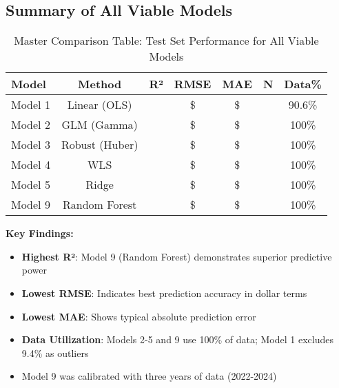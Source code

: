 \subsection{Summary of All Viable Models}

\begin{table}[h!]
\centering
\caption{Master Comparison Table: Test Set Performance for All Viable Models}
\label{tab:master_comparison}
\begin{tabular}{lcccccc}
\toprule
\textbf{Model} & \textbf{Method} & \textbf{R²} & \textbf{RMSE} & \textbf{MAE} & \textbf{N} & \textbf{Data\%} \\
\midrule
Model 1 & Linear (OLS) & \ModelOneRSquaredTest{} & \$\ModelOneRMSETest{} & \$\ModelOneMAETest{} & \ModelOneTestSamples{} & 90.6\% \\
Model 2 & GLM (Gamma) & \ModelTwoRSquaredTest{} & \$\ModelTwoRMSETest{} & \$\ModelTwoMAETest{} & \ModelTwoTestSamples{} & 100\% \\
Model 3 & Robust (Huber) & \ModelThreeRSquaredTest{} & \$\ModelThreeRMSETest{} & \$\ModelThreeMAETest{} & \ModelThreeTestSamples{} & 100\% \\
Model 4 & WLS & \ModelFourRSquaredTest{} & \$\ModelFourRMSETest{} & \$\ModelFourMAETest{} & \ModelFourTestSamples{} & 100\% \\
Model 5 & Ridge & \ModelFiveRSquaredTest{} & \$\ModelFiveRMSETest{} & \$\ModelFiveMAETest{} & \ModelFiveTestSamples{} & 100\% \\
Model 9 & Random Forest & \ModelNineRSquaredTest{} & \$\ModelNineRMSETest{} & \$\ModelNineMAETest{} & \ModelNineTestSamples{} & 100\% \\
\bottomrule
\end{tabular}
\end{table}

\textbf{Key Findings:}
\begin{itemize}
    \item \textbf{Highest R²}: Model 9 (Random Forest) demonstrates superior predictive power
    \item \textbf{Lowest RMSE}: Indicates best prediction accuracy in dollar terms
    \item \textbf{Lowest MAE}: Shows typical absolute prediction error
    \item \textbf{Data Utilization}: Models 2-5 and 9 use 100\% of data; Model 1 excludes 9.4\% as outliers
    \item Model 9 was calibrated with three years of data (2022-2024)
\end{itemize}

